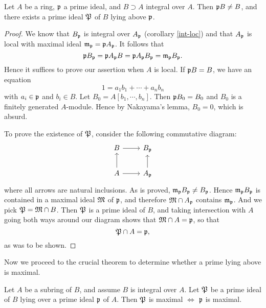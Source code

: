 			\begin{theorem}\label{lying-above}
				Let $A$ be a ring, $\mathfrak{p}$ a prime ideal, and $B \supset A$ integral over $A$. Then $\mathfrak{p}B \ne B$, and there exists a prime ideal $\mathfrak{P}$ of $B$ lying above $\mathfrak{p}$. 
			\end{theorem}
			
			\begin{proof}
				We know that $B_\mathfrak{p}$ is integral over $A_\mathfrak{p}$ (corollary \ref{int-loc}) and that $A_\mathfrak{p}$ is local with maximal ideal $\mathfrak{m}_\mathfrak{p}=\mathfrak{p}A_\mathfrak{p}$. It follows that
				\[
				\mathfrak{p}B_\mathfrak{p}=\mathfrak{p}A_\mathfrak{p}B = \mathfrak{p}A_\mathfrak{p}B_\mathfrak{p}=\mathfrak{m}_\mathfrak{p}B_\mathfrak{p}.
				\]
				Hence it suffices to prove our assertion when $A$ is local. If $\mathfrak{p}B=B$, we have an equation
				\[
				1 = a_1b_1+\cdots+a_nb_n
				\]
				with $a_i \in \mathfrak{p}$ and $b_i \in B$. Let $B_0 = A[b_1,\cdots,b_n]$. Then $\mathfrak{p}B_0=B_0$ and $B_0$ is a finitely generated $A$-module. Hence by Nakayama's lemma, $B_0=0$, which is absurd.
				
				To prove the existence of $\mathfrak{P}$, consider the following commutative diagram:
				\[
				\begin{tikzcd}
					B \arrow[r]           & B_\mathfrak{p}           \\
					A \arrow[r] \arrow[u] & A_\mathfrak{p} \arrow[u]
				\end{tikzcd}
				\]
				where all arrows are natural inclusions. As is proved, $\mathfrak{m}_\mathfrak{p}B_\mathfrak{p} \ne B_\mathfrak{p}$. Hence $\mathfrak{m}_\mathfrak{p}B_\mathfrak{p}$ is contained in a maximal ideal $\mathfrak{M}$ of $\mathfrak{p}$, and therefore $\mathfrak{M} \cap A_\mathfrak{p}$ contains $\mathfrak{m}_\mathfrak{p}$. And we pick $\mathfrak{P}=\mathfrak{M} \cap B$. Then $\mathfrak{P}$ is a prime ideal of $B$, and taking intersection with $A$ going both ways around our diagram shows that $\mathfrak{M} \cap A = \mathfrak{p}$, so that
				\[
				\mathfrak{P} \cap A = \mathfrak{p},
				\]
				as was to be shown.
			\end{proof}
			
			Now we proceed to the crucial theorem to determine whether a prime lying above is maximal.
			
			\begin{theorem}\label{lie-above-maximal}
				Let $A$ be a subring of $B$, and assume $B$ is integral over $A$. Let $\mathfrak{P}$ be a prime ideal of $B$ lying over a prime ideal $\mathfrak{p}$ of $A$. Then $\mathfrak{P}$ is maximal $\iff$ $\mathfrak{p}$ is maximal.
			\end{theorem}
			
